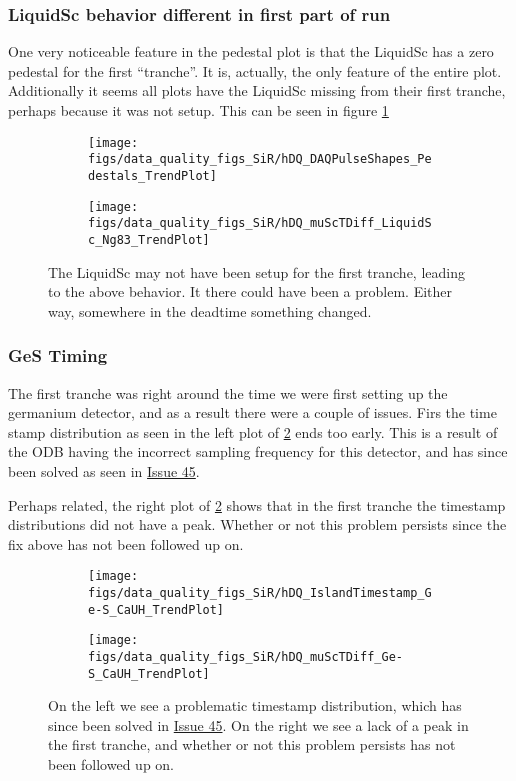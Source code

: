 \documentclass[a4paper]{article}
\newcommand{\issue}[1]{\href{https://github.com/alcap-org/AlcapDAQ/issues/#1}{Issue #1}}
\begin{document}
\subsubsection{LiquidSc behavior different in first part of run}
\label{sec:lqsc_setup}
One very noticeable feature in the pedestal plot is that the LiquidSc has a zero pedestal for the first ``tranche''. It is, actually, the only feature of the entire plot.
Additionally it seems all plots have the LiquidSc missing from their first tranche, perhaps because it was not setup.
This can be seen in figure \ref{fig:sir_lqcd_setup}

\begin{figure}
  \centering
  \begin{subfigure}{0.5\textwidth}
    \texttt{[image: figs/data\_quality\_figs\_SiR/hDQ\_DAQPulseShapes\_Pedestals\_TrendPlot]}
  \end{subfigure}%
  \begin{subfigure}{0.5\textwidth}
    \texttt{[image: figs/data\_quality\_figs\_SiR/hDQ\_muScTDiff\_LiquidSc\_Ng83\_TrendPlot]}
  \end{subfigure}
  \caption{The LiquidSc may not have been setup for the first tranche, leading to the above
    behavior. It there could have been a problem. Either way, somewhere in the deadtime something
    changed.}
  \label{fig:sir_lqcd_setup}
\end{figure}


\subsubsection{GeS Timing}
The first tranche was right around the time we were first setting up the germanium detector, and as a result there were a couple of issues.
Firs the time stamp distribution as seen in the left plot of \ref{fig:sir_ges_timestamps} ends too early. This is a result of the ODB
having the incorrect sampling frequency for this detector, and has since been solved as seen in \issue{45}.

Perhaps related, the right plot of \ref{fig:sir_ges_timestamps} shows that in the first tranche the timestamp distributions did not
have a peak. Whether or not this problem persists since the fix above has not been followed up on.

\begin{figure}
  \centering
  \begin{subfigure}{0.5\textwidth}
    \texttt{[image: figs/data\_quality\_figs\_SiR/hDQ\_IslandTimestamp\_Ge-S\_CaUH\_TrendPlot]}
  \end{subfigure}%
  \begin{subfigure}{0.5\textwidth}
    \texttt{[image: figs/data\_quality\_figs\_SiR/hDQ\_muScTDiff\_Ge-S\_CaUH\_TrendPlot]}
  \end{subfigure}
  \caption{On the left we see a problematic timestamp distribution, which has since been solved in \issue{45}.
    On the right we see a lack of a peak in the first tranche, and whether or not this problem persists has not
    been followed up on.}
  \label{fig:sir_ges_timestamps}
\end{figure}
\end{document}
